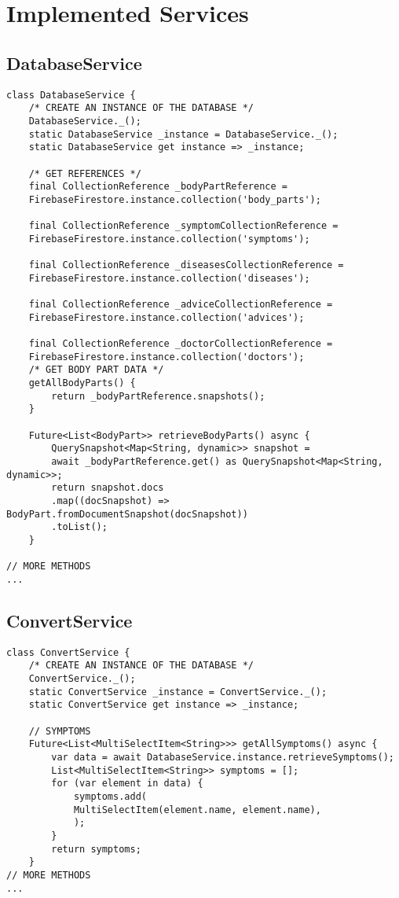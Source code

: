 \tocless\chapter{Implemented Services}
\tocless\section{DatabaseService}
\begin{lstlisting}[caption=DatabaseService Code]
class DatabaseService {
	/* CREATE AN INSTANCE OF THE DATABASE */
	DatabaseService._();
	static DatabaseService _instance = DatabaseService._();
	static DatabaseService get instance => _instance;
	
	/* GET REFERENCES */
	final CollectionReference _bodyPartReference =
	FirebaseFirestore.instance.collection('body_parts');
	
	final CollectionReference _symptomCollectionReference =
	FirebaseFirestore.instance.collection('symptoms');
	
	final CollectionReference _diseasesCollectionReference =
	FirebaseFirestore.instance.collection('diseases');
	
	final CollectionReference _adviceCollectionReference =
	FirebaseFirestore.instance.collection('advices');
	
	final CollectionReference _doctorCollectionReference =
	FirebaseFirestore.instance.collection('doctors');
	/* GET BODY PART DATA */
	getAllBodyParts() {
		return _bodyPartReference.snapshots();
	}
	
	Future<List<BodyPart>> retrieveBodyParts() async {
		QuerySnapshot<Map<String, dynamic>> snapshot =
		await _bodyPartReference.get() as QuerySnapshot<Map<String, dynamic>>;
		return snapshot.docs
		.map((docSnapshot) => BodyPart.fromDocumentSnapshot(docSnapshot))
		.toList();
	}

// MORE METHODS 
...
\end{lstlisting}
\pagebreak
\tocless\section{ConvertService}
\begin{lstlisting}[caption=AppNavigator Class]
class ConvertService {
	/* CREATE AN INSTANCE OF THE DATABASE */
	ConvertService._();
	static ConvertService _instance = ConvertService._();
	static ConvertService get instance => _instance;
	
	// SYMPTOMS
	Future<List<MultiSelectItem<String>>> getAllSymptoms() async {
		var data = await DatabaseService.instance.retrieveSymptoms();
		List<MultiSelectItem<String>> symptoms = [];
		for (var element in data) {
			symptoms.add(
			MultiSelectItem(element.name, element.name),
			);
		}
		return symptoms;
	}
// MORE METHODS
...
\end{lstlisting}
